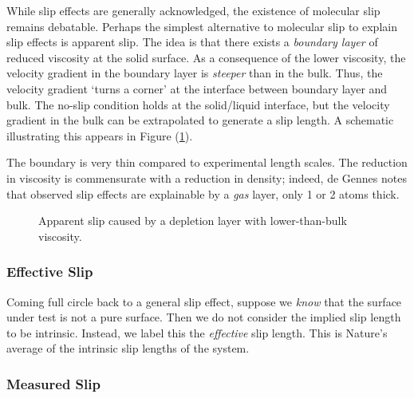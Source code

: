 \documentclass[12pt, a4paper, twoside, openright]{book}
\begin{document}
While slip effects are generally acknowledged, the existence of molecular slip remains debatable. Perhaps the simplest alternative to molecular slip to explain slip effects is apparent slip. The idea is that there exists a \emph{boundary layer} of reduced viscosity at the solid surface. As a consequence of the lower viscosity, the velocity gradient in the boundary layer is \emph{steeper} than in the bulk. Thus, the velocity gradient `turns a corner' at the interface between boundary layer and bulk. The no-slip condition holds at the solid/liquid interface, but the velocity gradient in the bulk can be extrapolated to generate a slip length.  A schematic illustrating this appears in Figure (\ref{depletion}).

The boundary is very thin compared to experimental length scales. The reduction in viscosity is commensurate with a reduction in density; indeed, de Gennes notes that observed slip effects are explainable by a \emph{gas} layer, only 1 or 2 atoms thick. 

\begin{figure}[ht]
\centering
{}
\caption{Apparent slip caused by a depletion layer with lower-than-bulk viscosity.} \label{depletion}
\end{figure}

\subsubsection*{Effective Slip}

Coming full circle back to a general slip effect, suppose we \emph{know} that the surface under test is not a pure surface.  Then we do not consider the implied slip length to be intrinsic. Instead, we label this the \emph{effective} slip length. This is Nature's average of the intrinsic slip lengths of the system.


\subsubsection*{Measured Slip}
\end{document}
